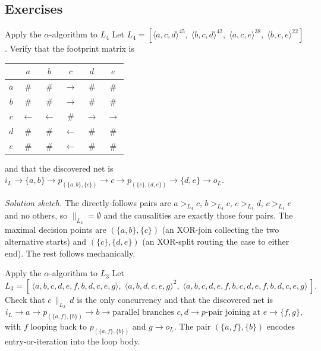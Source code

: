 \subsection{Exercises}

\begin{examplebox}{Apply the $\alpha$-algorithm to $L_4$}
Let $L_4 = [\langle a, c, d\rangle^{45},\;\langle b, c, d\rangle^{42},\;\langle a, c, e\rangle^{38},\;\langle b, c, e\rangle^{22}]$. Verify that the footprint matrix is
\begin{center}
\begin{tabular}{c|ccccc}
      & $a$    & $b$    & $c$        & $d$           & $e$           \\
\hline
$a$   & $\#$  & $\#$  & $\to$      & $\#$          & $\#$          \\
$b$   & $\#$  & $\#$  & $\to$      & $\#$          & $\#$          \\
$c$   & $\leftarrow$ & $\leftarrow$ & $\#$ & $\to$  & $\to$         \\
$d$   & $\#$  & $\#$  & $\leftarrow$ & $\#$        & $\#$          \\
$e$   & $\#$  & $\#$  & $\leftarrow$ & $\#$        & $\#$          \\
\end{tabular}
\end{center}
and that the discovered net is $i_L \to \{a, b\} \to p_{(\{a, b\}, \{c\})} \to c \to p_{(\{c\}, \{d, e\})} \to \{d, e\} \to o_L$.
\end{examplebox}

\textit{Solution sketch.} The directly-follows pairs are $a >_{L_4} c$, $b >_{L_4} c$, $c >_{L_4} d$, $c >_{L_4} e$ and no others, so $\|_{L_4} = \emptyset$ and the causalities are exactly those four pairs. The maximal decision points are $(\{a, b\}, \{c\})$ (an XOR-join collecting the two alternative starts) and $(\{c\}, \{d, e\})$ (an XOR-split routing the case to either end). The rest follows mechanically.

\begin{examplebox}{Apply the $\alpha$-algorithm to $L_3$}
Let
\[
  L_3 = [\,\langle a, b, c, d, e, f, b, d, c, e, g\rangle,\;\langle a, b, d, c, e, g\rangle^2,\;\langle a, b, c, d, e, f, b, c, d, e, f, b, d, c, e, g\rangle\,].
\]
Check that $c \,\|_{L_3}\, d$ is the only concurrency and that the discovered net is
\[
  i_L \to a \to p_{(\{a, f\}, \{b\})} \to b \to \text{parallel branches } c, d \to p\text{-pair joining at } e \to \{f, g\},
\]
with $f$ looping back to $p_{(\{a, f\}, \{b\})}$ and $g \to o_L$. The pair $(\{a, f\}, \{b\})$ encodes entry-or-iteration into the loop body.
\end{examplebox}

